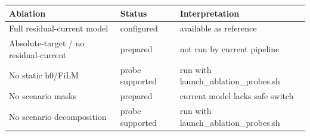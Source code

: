 \begin{tabular}{lll}
\toprule
Ablation & Status & Interpretation \\
\midrule
Full residual-current model & configured & available as reference \\
Absolute-target / no residual-current & prepared & not run by current pipeline \\
No static h0/FiLM & probe supported & run with launch\_ablation\_probes.sh \\
No scenario masks & prepared & current model lacks safe switch \\
No scenario decomposition & probe supported & run with launch\_ablation\_probes.sh \\
\bottomrule
\end{tabular}
